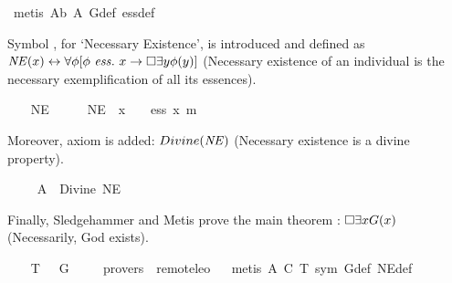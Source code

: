 \begin{isabellebody}
\endisadelimproof
%
\isatagproof
{}\isamarkupfalse%
\ {\isacharparenleft}metis\ A{}b\ A{}\ G{\isacharunderscore}def\ ess{\isacharunderscore}def{\isacharparenright}%
\endisatagproof
{\isafoldproof}%
%
\isadelimproof
%
\endisadelimproof
%
\begin{isamarkuptext}%
Symbol , for `Necessary Existence', is introduced and
defined as $\mathit{NE}(x) \leftrightarrow \forall \phi [\phi \ \mathit{ess.} \ x \rightarrow \Box \exists y \phi(y)]$ (Necessary 
existence of an individual is the necessary exemplification of all its essences).%
\end{isamarkuptext}%
\isamarkuptrue%
\ \ \isamarkupfalse%
\ NE\ {\isacharcolon}{\isacharcolon}\ {\isachardoublequoteopen}{\isasymmu}\ {\isasymRightarrow}\ {\isasymsigma}{\isachardoublequoteclose}\ \ {\isachardoublequoteopen}NE\ {\isacharequal}\ {\isacharparenleft}{\isasymlambda}x{\isachardot}\ {\isasymPi}\ {\isacharparenleft}{\isasymlambda}{\isasymPhi}{\isachardot}\ {\isasymPhi}\ ess\ x\ m{\isasymRightarrow}\ {\isasymbox}\ {\isacharparenleft}{\isasymexists}\ {\isasymPhi}{\isacharparenright}{\isacharparenright}{\isacharparenright}{\isachardoublequoteclose}%
\begin{isamarkuptext}%
Moreover, axiom  is added: $Divine(\mathit{NE})$ (Necessary existence is a divine 
property).%
\end{isamarkuptext}%
\isamarkuptrue%
\ \ \isamarkupfalse%
\ \ A{}{\isacharcolon}\ \ {\isachardoublequoteopen}{\isacharbrackleft}Divine\ NE{\isacharbrackright}{\isachardoublequoteclose}%
\begin{isamarkuptext}%
Finally, Sledgehammer and Metis prove the main theorem : $\Box \exists x G(x)$ 
(Necessarily, God exists).%
\end{isamarkuptext}%
\isamarkuptrue%
\ \ \isamarkupfalse%
\ T{}{\isacharcolon}\ {\isachardoublequoteopen}{\isacharbrackleft}{\isasymbox}\ {\isacharparenleft}{\isasymexists}\ G{\isacharparenright}{\isacharbrackright}{\isachardoublequoteclose}\ \isanewline
\ \ \isamarkupfalse%
\ {\isacharbrackleft}provers\ {\isacharequal}\ remote{\isacharunderscore}leo{}{\isacharbrackright}%
\isadelimproof
\ %
\endisadelimproof
%
\isatagproof
{}\isamarkupfalse%
\ {\isacharparenleft}metis\ A{}\ C\ T{}\ sym\ G{\isacharunderscore}def\ NE{\isacharunderscore}def{\isacharparenright}%
\endisatagproof
{\isafoldproof}%

\end{isabellebody}
